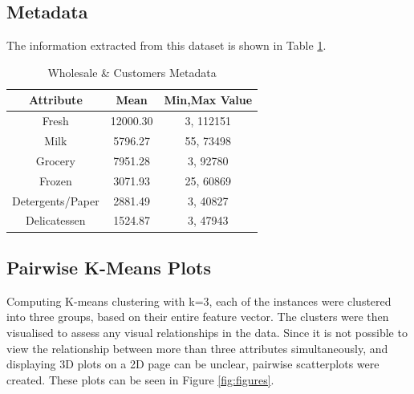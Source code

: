 \documentclass{article}
\begin{document}
\subsection{Metadata}

\noindent The information extracted from this dataset is shown in Table \ref{table:shopMet}.

\vspace{4mm}

\begin{table}
        \centering
        
\begin{tabular}{|c|c|c|}
        \hline
        Attribute & Mean & Min,Max Value\\
        \hline
        Fresh  &  12000.30 & 3, 112151\\
        Milk  &  5796.27 & 55, 73498\\
        Grocery  &  7951.28 & 3, 92780\\
        Frozen  &  3071.93 & 25, 60869\\
        Detergents/Paper  &  2881.49 & 3, 40827\\
        Delicatessen  &  1524.87 & 3, 47943\\
        \hline

\end{tabular}

\caption{Wholesale \& Customers Metadata}
        \label{table:shopMet}


\end{table}


\subsection{Pairwise K-Means Plots}

Computing K-means clustering with k=3, each of the instances were clustered into three groups, 
based on their entire feature vector. The clusters were then visualised to assess any visual relationships in the data.
 Since it is not possible to view the relationship between more than three attributes simultaneously,
and displaying 3D plots on a 2D page can be unclear, pairwise scatterplots were created. These plots can be seen in Figure \ref{fig:figures}.
\end{document}
